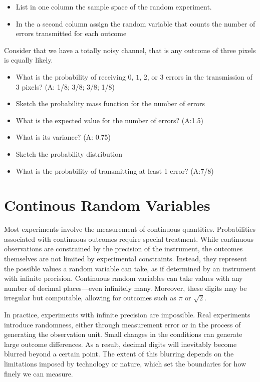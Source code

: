\documentclass[
]{book}
\begin{document}
\begin{itemize}
\item
  List in one column the sample space of the random experiment.
\item
  In the a second column assign the random variable that counts the number of errors transmitted for each outcome
\end{itemize}

Consider that we have a totally noisy channel, that is any outcome of three pixels is equally likely.

\begin{itemize}
\item
  What is the probability of receiving \(0\), \(1\), \(2\), or \(3\) errors in the transmission of \(3\) pixels? (A: 1/8; 3/8; 3/8; 1/8)
\item
  Sketch the probability mass function for the number of errors
\item
  What is the expected value for the number of errors? (A:1.5)
\item
  What is its variance? (A: 0.75)
\item
  Sketch the probability distribution
\item
  What is the probability of transmitting at least 1 error? (A:7/8)
\end{itemize}

\hypertarget{continous-random-variables}{%
\chapter{Continous Random Variables}\label{continous-random-variables}}

Most experiments involve the measurement of continuous quantities. Probabilities associated with continuous outcomes require special treatment. While continuous observations are constrained by the precision of the instrument, the outcomes themselves are not limited by experimental constraints. Instead, they represent the possible values a random variable can take, as if determined by an instrument with infinite precision. Continuous random variables can take values with any number of decimal places---even infinitely many. Moreover, these digits may be irregular but computable, allowing for outcomes such as
\(\pi\) or \(\sqrt{2}\).

In practice, experiments with infinite precision are impossible. Real experiments introduce randomness, either through measurement error or in the process of generating the observation unit. Small changes in the conditions can generate large outcome differences. As a result, decimal digits will inevitably become blurred beyond a certain point. The extent of this blurring depends on the limitations imposed by technology or nature, which set the boundaries for how finely we can measure.
\end{document}
